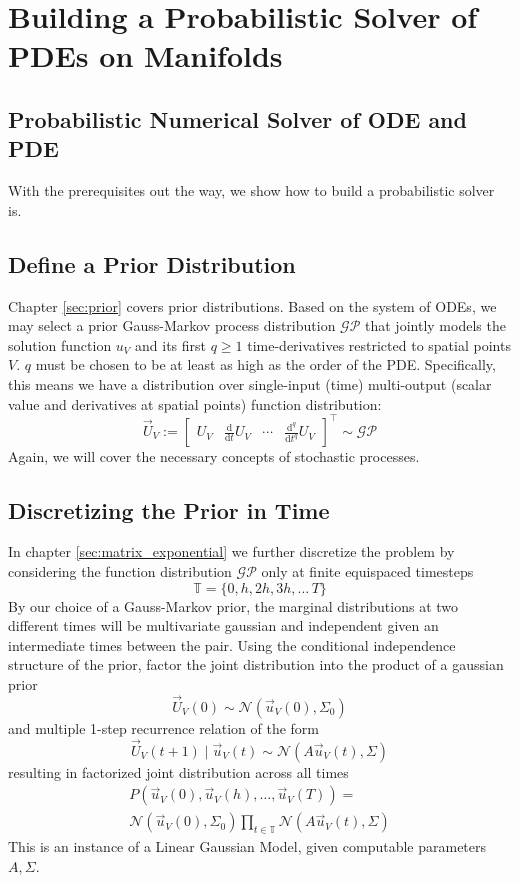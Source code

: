 \section{Building a Probabilistic Solver of PDEs on Manifolds}
\subsection*{Probabilistic Numerical Solver of ODE and PDE}
With the prerequisites out the way, we show how to build a probabilistic solver is.
\subsection*{Define a Prior Distribution}
Chapter \ref{sec:prior} covers prior distributions. Based on the system of ODEs, we may select a prior Gauss-Markov process distribution $\mathcal{GP}$ that jointly models the solution function $u_V$ and its first $q\geq 1$ time-derivatives restricted to spatial points $V$. $q$ must be chosen to be at least as high as the order of the PDE. Specifically, this means we have a distribution over single-input (time) multi-output (scalar value and derivatives at spatial points) function distribution: $$\vec{U}_V :=\begin{bmatrix} U_V & \frac{\text{d}}{\text{d} t} U_V & \cdots & \frac{\text{d}^q}{\text{d} t^q} U_V\end{bmatrix}^{\intercal} \sim \mathcal{GP}$$ Again, we will cover the necessary concepts of stochastic processes.

\subsection*{Discretizing the Prior in Time}
In chapter \ref{sec:matrix_exponential} we further discretize the problem by considering the function distribution $\mathcal{GP}$ only at finite equispaced timesteps $$\mathbb{T} = \{0, h, 2h, 3h, \dots\, T\}$$ 
By our choice of a Gauss-Markov prior, the marginal distributions at two different times will be multivariate gaussian and independent given an intermediate times between the pair. Using the conditional independence structure of the prior, factor the joint distribution into the product of a gaussian prior $$\vec{U}_V(0) \sim \mathcal{N}(\vec{u}_V(0), \Sigma_0)$$ and multiple 1-step recurrence relation of the form $$\vec{U}_V(t+1) \;|\; \vec{u}_V(t) \sim \mathcal{N}(A\vec{u}_V(t), \Sigma)$$ 
resulting in factorized joint distribution across all times 
\begin{align*}
    P(\vec{u}_V(0), \vec{u}_V(h), \dots, \vec{u}_V(T)) = 
    \\ 
    \mathcal{N}(\vec{u}_V(0), \Sigma _0)\prod_{t\in \mathbb{T}} \mathcal{N}(A\vec{u}_V(t), \Sigma)
\end{align*}
This is an instance of a Linear Gaussian Model, given computable parameters $A, \Sigma$.

